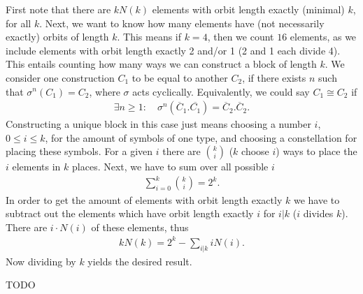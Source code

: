 \begin{solution}[7.1]
		First note that there are $kN(k)$ elements with orbit length exactly (minimal) $k$, for all $k$. Next, we want to know how many elements have (not necessarily exactly) orbits of length $k$. This means if $k=4$, then we count $16$ elements, as we include elements with orbit length exactly 2 and/or 1 (2 and 1 each divide 4). This entails counting how many ways we can construct a block of length $k$. We consider one construction $C_1$ to be equal to another $C_2$, if there exists $n$ such that $\sigma^{n}(C_1)=C_2$, where $\sigma$ acts cyclically. Equivalently, we could say $C_1 \cong C_2$ if 
\begin{align}
	\exists n\geq 1:\quad \sigma^{n}\left(\overline{C}_1.\overline{C_1}\right) = \overline{C}_2.\overline{C}_2.	
\end{align}
Constructing a unique block in this case just means choosing a number $i$, $0 \leq i \leq k$, for the amount of symbols of one type, and choosing a constellation for placing these symbols. For a given $i$ there are $\binom{k}{i}$ ($k$ choose $i$) ways to place the $i$ elements in $k$ places. Next, we have to sum over all possible $i$ 
\begin{align}
	\sum_{i=0}^{k} \binom{k}{i} = 2^{k}.
\end{align}
In order to get the amount of elements with orbit length exactly $k$ we have to subtract out the elements which have orbit length exactly $i$ for $i | k$ ($i$ divides $k $). There are $i\cdot N(i)$ of these elements, thus
\begin{align}
	kN(k) = 2^{k} - \sum_{i|k}^{} iN(i).
\end{align}
Now dividing by $k$ yields the desired result.
\end{solution}

\begin{solution}[7.2]
TODO	
\end{solution}

